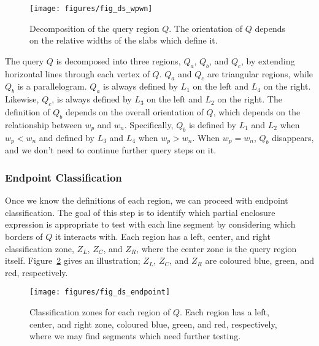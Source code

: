 \begin{figure}[t]
\begin{center}
  \texttt{[image: figures/fig\_ds\_wpwn]}
  \caption[Decomposition of the query region $Q$.]{Decomposition of the query region $Q$. The orientation of $Q$ depends on the relative widths of the slabs which define it.}
  \label{fig:slabs:two:wpwn}
\end{center}
\end{figure}

The query $Q$ is decomposed into three regions, $Q_a$, $Q_b$, and $Q_c$, by extending horizontal lines through each vertex of $Q$.
$Q_a$ and $Q_c$ are triangular regions, while $Q_b$ is a parallelogram. 
$Q_a$ is always defined by $L_1$ on the left and $L_4$ on the right. 
Likewise, $Q_c$, is always defined by $L_3$ on the left and $L_2$ on the right. 
The definition of $Q_b$ depends on the overall orientation of $Q$, which depends on the relationship between $w_p$ and $w_n$.
Specifically, $Q_b$ is defined by $L_1$ and $L_2$ when $w_p < w_n$ and defined by $L_3$ and $L_4$ when $w_p > w_n$.
When $w_p = w_n$, $Q_b$ disappears, and we don't need to continue further query steps on it.


\subsubsection{Endpoint Classification}

Once we know the definitions of each region, we can proceed with endpoint classification.
The goal of this step is to identify which partial enclosure expression is appropriate to test with each line segment by considering which borders of $Q$ it interacts with. 
Each region has a left, center, and right classification zone, $Z_L$, $Z_C$, and $Z_R$, where the center zone is the query region itself.
Figure~\ref{fig:slabs:two:endpoint} gives an illustration; $Z_L$, $Z_C$, and $Z_R$ are coloured blue, green, and red, respectively.

\begin{figure}[t]
\begin{center}
  \texttt{[image: figures/fig\_ds\_endpoint]}
  \caption[Classification zones for $Q$.]{Classification zones for each region of $Q$. Each region has a left, center, and right zone, coloured blue, green, and red, respectively, where we may find segments which need further testing.}
  \label{fig:slabs:two:endpoint}
\end{center}
\end{figure}

